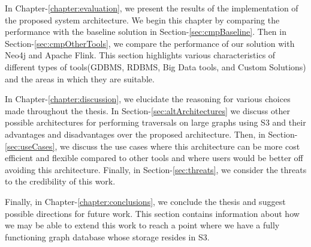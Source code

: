\medskip
In Chapter-\ref{chapter:evaluation}, we present the results of the
implementation of the proposed system architecture. We begin this chapter by
comparing the performance with the baseline solution in
Section-\ref{sec:cmpBaseline}. Then in Section-\ref{sec:cmpOtherTools}, we
compare the performance of our solution with Neo4j and Apache Flink. This
section highlights various characteristics of different types of tools(GDBMS,
RDBMS, Big Data tools, and Custom Solutions) and the areas in which they 
are suitable. 

\medskip
In Chapter-\ref{chapter:discussion}, we elucidate the reasoning for various choices
made throughout the thesis.
In Section-\ref{sec:altArchitectures} we discuss other possible architectures for
performing traversals on large graphs using S3 and their advantages and
disadvantages over the proposed architecture. Then, in
Section-\ref{sec:useCases}, we discuss the use cases where this architecture
can be more cost efficient and flexible compared to other tools and where users
would be better off avoiding this architecture. Finally, in
Section-\ref{sec:threats}, we consider the threats to the credibility of this
work.

\medskip
Finally, in Chapter-\ref{chapter:conclusions}, we conclude the thesis and
suggest possible directions for future work. This section contains information
about how we may be able to extend this work to reach a point where we have a
fully functioning graph database whose storage resides in S3.

